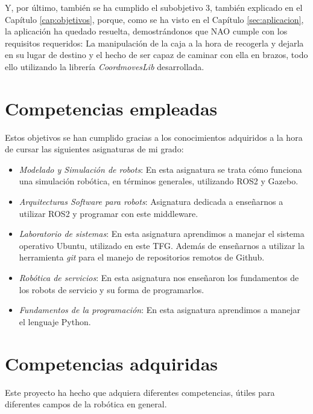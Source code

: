 Y, por último, también se ha cumplido el subobjetivo 3, también explicado en el Capítulo \ref{cap:objetivos}, porque, como se ha visto en el Capítulo \ref{sec:aplicacion}, la aplicación ha quedado resuelta, demostrándonos que NAO cumple con los requisitos requeridos: La manipulación de la caja a la hora de recogerla y dejarla en su lugar de destino y el hecho de ser capaz de caminar con ella en brazos, todo ello utilizando la librería \textit{CoordmovesLib} desarrollada.

\section{Competencias empleadas}

Estos objetivos se han cumplido gracias a los conocimientos adquiridos a la hora de cursar las siguientes asignaturas de mi grado:

\begin{itemize}
    \item \textit{Modelado y Simulación de robots}: En esta asignatura se trata cómo funciona una simulación robótica, en términos generales, utilizando ROS2 y Gazebo.
    \item \textit{Arquitecturas Software para robots}: Asignatura dedicada a enseñarnos a utilizar ROS2 y programar con este middleware.

    \item \textit{Laboratorio de sistemas}: En esta asignatura aprendimos a manejar el sistema operativo Ubuntu,  utilizado en este TFG. Además de enseñarnos a utilizar la herramienta \textit{git} para el manejo de repositorios remotos de Github.

    \item \textit{Robótica de servicios}: En esta asignatura nos enseñaron los fundamentos de los robots de servicio y su forma de programarlos.

    \item \textit{Fundamentos de la programación}: En esta asignatura aprendimos a manejar el lenguaje Python. 
    
\end{itemize}

\section{Competencias adquiridas}

Este proyecto ha hecho que adquiera diferentes competencias, útiles para diferentes campos de la robótica en general.

